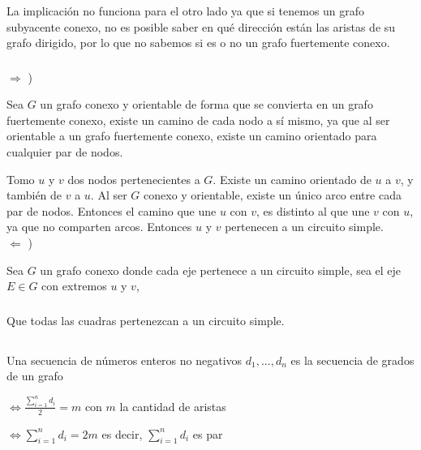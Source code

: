 La implicación no funciona para el otro lado ya que si tenemos un grafo subyacente conexo, no es posible saber en qué dirección están las aristas de su grafo dirigido, por lo que no sabemos si es o no un grafo fuertemente conexo.

\subsubsection{}

$\Longrightarrow$ )

Sea $G$ un grafo conexo y orientable de forma que se convierta en un grafo fuertemente conexo, existe un camino de cada nodo a sí mismo, ya que al ser orientable a un grafo fuertemente conexo, existe un camino orientado para cualquier par de nodos. 

Tomo $u$ y $v$ dos nodos pertenecientes a $G$. Existe un camino orientado de $u$ a $v$, y también de $v$ a $u$. Al ser $G$ conexo y orientable, existe un único arco entre cada par de nodos. Entonces el camino que une $u$ con $v$, es distinto al que une $v$ con $u$, ya que no comparten arcos. Entonces $u$ y $v$ pertenecen a un circuito simple. \\

$\Longleftarrow$ )

Sea $G$ un grafo conexo donde cada eje pertenece a un circuito simple, sea el eje $E \in G$ con extremos $u$ y $v$, 

\subsubsection{}
Que todas las cuadras pertenezcan a un circuito simple.

\setcounter{subsection}{11}
\subsection{}

Una secuencia de números enteros no negativos $d_1,...,d_n$ es la secuencia de grados de un grafo

$\Longleftrightarrow \frac{\sum_{i = 1}^{n}d_i}{2} = m$ con $m$ la cantidad de aristas

$\Longleftrightarrow \sum_{i = 1}^{n}d_i = 2m$ es decir, $\sum_{i = 1}^{n}d_i$ es par

\subsection{}

